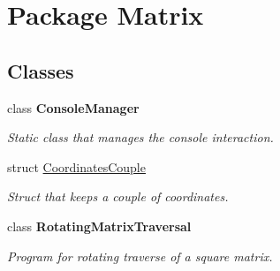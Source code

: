 \hypertarget{namespace_matrix}{\section{Package Matrix}
\label{namespace_matrix}
}
\subsection*{Classes}
\begin{DoxyCompactItemize}
\item 
class {\bfseries Console\+Manager}
\begin{DoxyCompactList}\small\item\em Static class that manages the console interaction. \end{DoxyCompactList}\item 
struct \hyperlink{struct_matrix_1_1_coordinates_couple}{Coordinates\+Couple}
\begin{DoxyCompactList}\small\item\em Struct that keeps a couple of coordinates. \end{DoxyCompactList}\item 
class {\bfseries Rotating\+Matrix\+Traversal}
\begin{DoxyCompactList}\small\item\em Program for rotating traverse of a square matrix. \end{DoxyCompactList}\end{DoxyCompactItemize}
